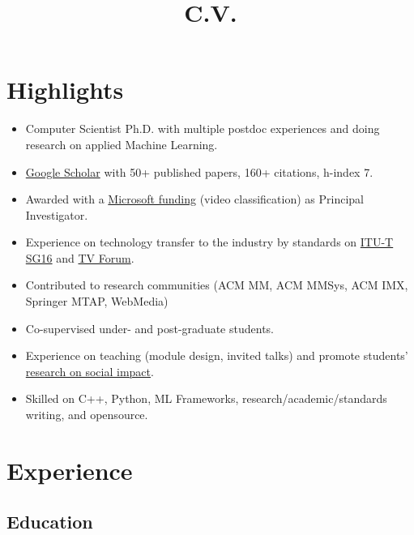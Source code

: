 \documentclass[10pt,a4paper,sans,colorlinks]{moderncv}
\title{C.V.}
\begin{document}
\setHyperrefBlueLinks
\makecvtitle
\vspace{-2em}

\section{Highlights}

\begin{itemize}
    \item Computer Scientist Ph.D. with multiple postdoc experiences and doing research on applied Machine Learning.
    \item \href{https://scholar.google.com/citations?user=1bEOmkUAAAAJ&hl=en}{Google Scholar} with 50+ published papers, 160+ citations, h-index 7.
    \item Awarded with a \href{https://www.rnp.br/en/rnp-and-microsoft-challenge-artificial-intelligence}{Microsoft funding} (video classification) as Principal Investigator.
    \item Experience on technology transfer to the industry by standards on \href{http://www.itu.int/en/ITU-T/studygroups/2022-2024/16}{ITU-T SG16} and \href{http://forumsbtvd.org.br}{TV Forum}.
    \item Contributed to research communities (ACM MM, ACM MMSys, ACM IMX, Springer MTAP, WebMedia)
    \item Co-supervised under- and post-graduate students.
    \item Experience on teaching  (module design, invited talks) and promote students' \href{https://webmedia.org.br/2022/en/lf-award/}{research on social impact}.
    \item Skilled on C++, Python, ML Frameworks, research/academic/standards writing, and opensource.
\end{itemize}


\section{Experience}

\subsection{Education}
\end{document}

